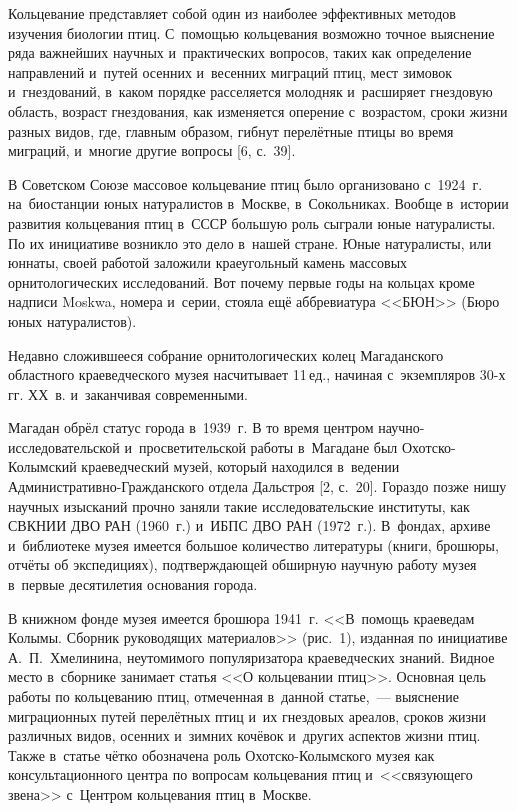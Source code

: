  

\makeProcTitle
{}

Кольцевание представляет собой один из наиболее эффективных методов изучения биологии птиц. С~помощью кольцевания возможно точное выяснение ряда важнейших научных и~практических вопросов, таких как определение направлений и~путей осенних и~весенних миграций птиц, мест зимовок и~гнездований, в~каком порядке расселяется молодняк и~расширяет гнездовую область, возраст гнездования, как изменяется оперение с~возрастом, сроки жизни разных видов, где, главным образом, гибнут перелётные птицы во время миграций, и~многие другие вопросы [6, с.~39].

В Советском Союзе массовое кольцевание птиц было организовано с~1924~г. на~биостанции юных натуралистов в~Москве, в~Сокольниках. Вообще в~истории развития кольцевания птиц в~СССР большую роль сыграли юные натуралисты. По их инициативе возникло это дело в~нашей стране. Юные натуралисты, или юннаты, своей работой заложили краеугольный камень массовых орнитологических исследований. Вот почему первые годы на кольцах кроме надписи Moskwa, номера и~серии, стояла ещё аббревиатура <<БЮН>> (Бюро юных натуралистов).



Недавно сложившееся собрание орнитологических колец Магаданского областного краеведческого музея насчитывает 11\,ед., начиная с~экземпляров 30-х гг. ХХ~в. и~заканчивая современными.

Магадан обрёл статус города в~1939~г. В то время центром научно-исследовательской и~просветительской работы в~Магадане был Охотско-Колымский краеведческий музей, который находился в~ведении Ад\-ми\-нист\-ра\-тив\-но-Гражданского отдела Дальстроя [2, с.~20]. Гораздо позже нишу научных изысканий прочно заняли такие исследовательские институты, как СВКНИИ ДВО РАН (1960~г.) и~ИБПС ДВО РАН (1972~г.). В~фондах, архиве и~библиотеке музея имеется большое количество литературы (книги, брошюры, отчёты об экспедициях), подтверждающей обширную научную работу музея в~первые десятилетия основания города.

В книжном фонде музея имеется брошюра 1941~г. <<В~помощь краеведам Колымы. Сборник руководящих материалов>> (рис.~1), изданная по инициативе А.~П.~Хмелинина, неутомимого популяризатора краеведческих знаний. Видное место в~сборнике занимает статья <<О кольцевании птиц>>. Основная цель работы по кольцеванию птиц, отмеченная в~данной статье,~--- выяснение миграционных путей перелётных птиц и~их гнездовых ареалов, сроков жизни различных видов, осенних и~зимних кочёвок и~других аспектов жизни птиц. Также в~статье чётко обозначена роль Охотско-Колымского музея как консультационного центра по вопросам кольцевания птиц и~<<связующего звена>> с~Центром кольцевания птиц в~Москве.

